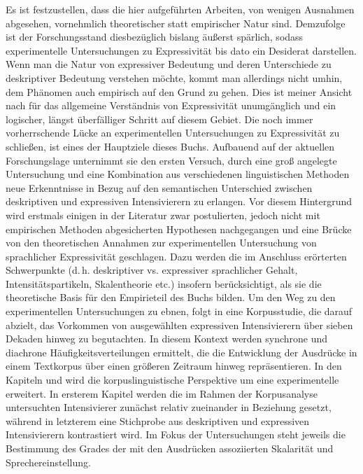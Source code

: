 Es ist festzustellen, dass die hier aufgeführten Arbeiten, von wenigen Ausnahmen abgesehen, vornehmlich theoretischer statt empirischer Natur sind. Demzufolge ist der Forschungsstand diesbezüglich bislang äußerst spärlich, sodass experimentelle Untersuchungen zu Expressivität bis dato ein Desiderat darstellen. Wenn man die Natur von expressiver Bedeutung und deren Unterschiede zu deskriptiver Bedeutung verstehen möchte, kommt man allerdings nicht umhin, dem Phänomen auch empirisch auf den Grund zu gehen. Dies ist meiner Ansicht nach für das allgemeine Verständnis von Expressivität unumgänglich und ein logischer, längst überfälliger Schritt auf diesem Gebiet. Die noch immer vorherrschende Lücke an experimentellen Untersuchungen zu Expressivität zu schließen, ist eines der Hauptziele dieses Buchs. Aufbauend auf der aktuellen Forschungslage unternimmt sie den ersten Versuch, durch eine groß angelegte Untersuchung und eine Kombination aus verschiedenen linguistischen Methoden neue Erkenntnisse in Bezug auf den semantischen Unterschied zwischen deskriptiven und expressiven Intensivierern zu erlangen. Vor diesem Hintergrund wird erstmals einigen in der Literatur zwar postulierten, jedoch nicht mit empirischen Methoden abgesicherten Hypothesen nachgegangen und eine Brücke von den theoretischen Annahmen zur experimentellen Untersuchung von sprachlicher Expressivität geschlagen. Dazu werden die im Anschluss erörterten Schwerpunkte (d.\,h. deskriptiver vs. expressiver sprachlicher Gehalt, Intensitätspartikeln, {Skalentheorie etc.}) insofern berücksichtigt, als sie die theoretische Basis für den Empirieteil des Buchs bilden. Um den Weg zu den experimentellen Untersuchungen zu ebnen, folgt in {} eine Korpusstudie, die darauf abzielt, das Vorkommen von ausgewählten expressiven Intensivierern über sieben Dekaden hinweg zu begutachten. In diesem Kontext werden synchrone und diachrone Häufigkeitsverteilungen ermittelt, die die Entwicklung der Ausdrücke in einem Textkorpus über einen größeren Zeitraum hinweg repräsentieren. In den {Kapiteln  und } wird die korpuslinguistische Perspektive um eine experimentelle erweitert. In ersterem Kapitel werden die im Rahmen der Korpusanalyse untersuchten Intensivierer zunächst relativ zueinander in Beziehung gesetzt, während in letzterem eine Stichprobe aus deskriptiven und expressiven Intensivierern kontrastiert wird. Im Fokus der Untersuchungen steht jeweils die Bestimmung des Grades der mit den Ausdrücken assoziierten Skalarität und Sprechereinstellung.

